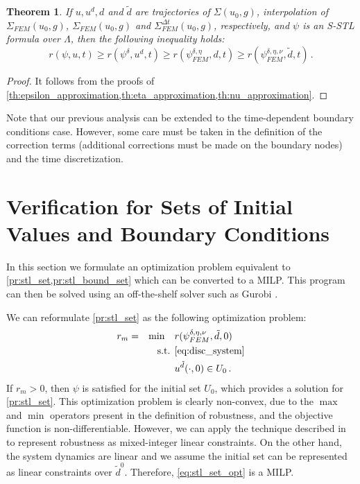 \documentclass[letterpaper, 10 pt, conference]{ieeeconf/ieeeconf}
\newtheorem{theorem}{Theorem}
\begin{document}
\begin{theorem}
    \label{th:robustness}
    If $u, u^d, d$ and $\tilde{d}$ are trajectories of $\Sigma(u_0, g)$, interpolation
    of $\Sigma_{FEM}(u_0, g)$, $\Sigma_{FEM}(u_0, g)$ and $\Sigma_{FEM}^{\Delta t}(u_0, g)$,
    respectively, and $\psi$ is an S-STL formula over $\Lambda$, then the 
    following inequality holds:
    \begin{equation}
        r(\psi, u, t) \geq r(\psi^{\delta}, u^d, t) \geq r(\psi^{\delta,
        \eta}_{FEM}, d, t) \geq r(\psi^{\delta, \eta, \nu}_{FEM}, \tilde{d}, t)
        \,.
    \end{equation}
\end{theorem}
\begin{proof}
    It follows from the proofs of
    \cref{th:epsilon_approximation,th:eta_approximation,th:nu_approximation}.
\end{proof}

Note that our previous analysis can be extended to the time-dependent
boundary conditions case. However, some care must be taken in the
definition of the correction terms (additional corrections must be made on the
boundary nodes) and the time discretization.

\section{Verification for Sets of Initial Values and Boundary Conditions}
\label{sec:verification_of_initial_sets}

In this section we formulate an optimization problem equivalent to
\cref{pr:stl_set,pr:stl_bound_set} which can be converted to a
MILP. This program can then be solved using an off-the-shelf solver such 
as Gurobi \cite{gurobi}.

We can reformulate \cref{pr:stl_set} as the following optimization problem:
%
\begin{equation}
    \label{eq:stl_set_opt}
    \begin{aligned}
        &r_m = &\min \quad &r(\psi^{\delta, \eta, \nu}_{FEM}, \tilde{d}, 0) \\
        &  &\text{s.t. } &\cref{eq:disc_system} \\
        &  & &u^{\tilde{d}}(\cdot, 0) \in U_0 \,.
    \end{aligned}
\end{equation}
%
If $r_m > 0$, then $\psi$ is satisfied for the initial set $U_0$, which provides
a solution for \cref{pr:stl_set}. This
optimization problem is clearly non-convex, due to the $\max$ and $\min$
operators present in the definition of robustness, and the objective function is
non-differentiable. However, we can apply the technique described in
\cite{sadraddini_robust_2015} to
represent robustness as mixed-integer linear constraints. On the other hand, the
system dynamics are linear and we assume the initial set can be represented as
linear constraints over $\tilde{d}^0$. Therefore, \cref{eq:stl_set_opt} is a
MILP.
\end{document}
